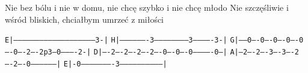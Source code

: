 \documentclass[../../../songbook.tex]{subfiles}
\begin{document}
Nie bez bólu i nie w domu, nie chcę szybko i nie chcę młodo				 \newline
Nie szczęśliwie i wśród bliskich, chciałbym umrzeć z miłości				 \newline

 \texttt{E|---------------------------------------------------------3-|}	\newline
 \texttt{H|-------------------3-----------------------3-------------3-|}	\newline
 \texttt{G|------0----0----0----0----0----0----2----2p3--0----------2-|}	\newline
 \texttt{D|----2----2----2----2----0----0----0-------------0---|}	\newline
 \texttt{A|---2----2----3----3----2----2----0------------------|}	\newline
 \texttt{E|-0----------------------3-----------------------------|}	\newline
\end{document}
